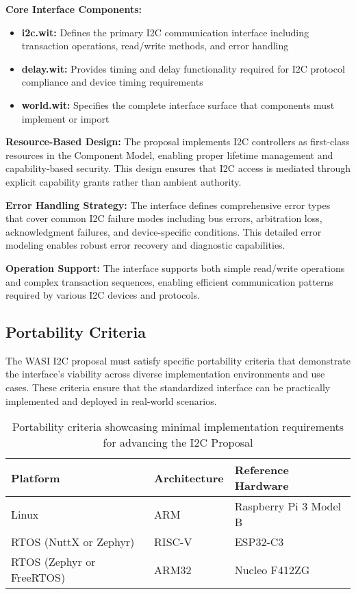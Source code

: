 \textbf{Core Interface Components:}
\begin{itemize}
    \item \textbf{i2c.wit:} Defines the primary I2C communication interface including transaction operations, read/write methods, and error handling
    \item \textbf{delay.wit:} Provides timing and delay functionality required for I2C protocol compliance and device timing requirements
    \item \textbf{world.wit:} Specifies the complete interface surface that components must implement or import
\end{itemize}

\textbf{Resource-Based Design:} The proposal implements I2C controllers as first-class resources in the Component Model, enabling proper lifetime management and capability-based security. This design ensures that I2C access is mediated through explicit capability grants rather than ambient authority.

\textbf{Error Handling Strategy:} The interface defines comprehensive error types that cover common I2C failure modes including bus errors, arbitration loss, acknowledgment failures, and device-specific conditions. This detailed error modeling enables robust error recovery and diagnostic capabilities.

\textbf{Operation Support:} The interface supports both simple read/write operations and complex transaction sequences, enabling efficient communication patterns required by various I2C devices and protocols.

\subsection{Portability Criteria}
\label{subsec:i2c-portability}

The WASI I2C proposal must satisfy specific portability criteria that demonstrate the interface's viability across diverse implementation environments and use cases. These criteria ensure that the standardized interface can be practically implemented and deployed in real-world scenarios.

\begin{table}[h]
	\centering
	\captionsetup{justification=centering}
	\caption{Portability criteria showcasing minimal implementation requirements for advancing the I2C Proposal}
	\label{tab:portability_criteria}
	\begin{tabular}{lll}
		\toprule
		\textbf{Platform} & \textbf{Architecture} & \textbf{Reference Hardware} \\
        \midrule
		Linux & ARM & Raspberry Pi 3 Model B \\
		RTOS (NuttX or Zephyr) & RISC-V & ESP32-C3 \\
        RTOS (Zephyr or FreeRTOS) & ARM32 & Nucleo F412ZG \\
		\bottomrule
	\end{tabular}
\end{table}

